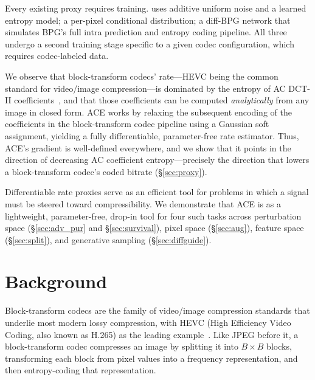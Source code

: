 \documentclass{article}
\theoremstyle{definition}
\begin{document}
Every existing proxy requires training.
\citet{balle2018variational} uses additive uniform noise and a learned entropy model; \citet{mentzer2018conditional} a per-pixel conditional distribution; \citet{guo2026generative} a diff-BPG network that simulates BPG's full intra prediction and entropy coding pipeline.
All three undergo a second training stage specific to a given codec configuration, which requires codec-labeled data.

We observe that block-transform codecs' rate---HEVC being the common standard for video/image compression---is dominated by the entropy of AC DCT-II coefficients~\citep{sullivan2012hevc}, and that those coefficients can be computed \emph{analytically} from any image in closed form.
ACE works by relaxing the subsequent encoding of the coefficients in the block-transform codec pipeline using a Gaussian soft assignment, yielding a fully differentiable, parameter-free rate estimator.
Thus, ACE's gradient is well-defined everywhere, and we show that it points in the direction of decreasing AC coefficient entropy---precisely the direction that lowers a block-transform codec's coded bitrate (\S\ref{sec:proxy}).

Differentiable rate proxies serve as an efficient tool for problems in which a signal must be steered toward compressibility.
We demonstrate that ACE is as a lightweight, parameter-free, drop-in tool for four such tasks across perturbation space (\S\ref{sec:adv_pur} and \S\ref{sec:survival}), pixel space (\S\ref{sec:aug}), feature space (\S\ref{sec:split}), and generative sampling (\S\ref{sec:diffguide}).

\section{Background}
\label{sec:background}

Block-transform codecs are the family of video/image compression standards that underlie most modern lossy compression, with HEVC (High Efficiency Video Coding, also known as H.265) as the leading example~\citep{sullivan2012hevc}. 
Like JPEG before it, a block-transform codec compresses an image by splitting it into $B\times B$ blocks, transforming each block from pixel values into a frequency representation, and then entropy-coding that representation.
\end{document}
